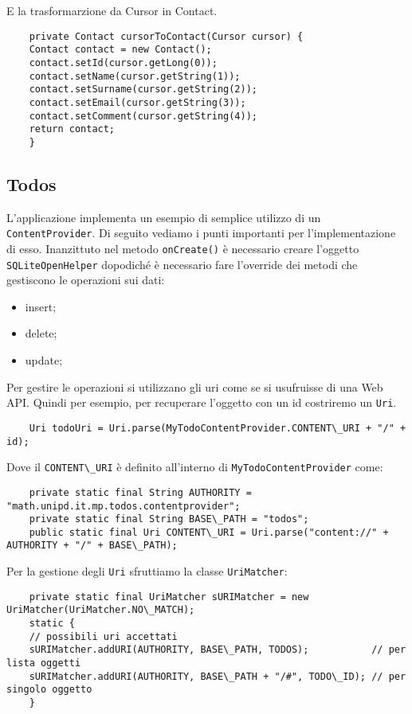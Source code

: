 	E la trasformarzione da Cursor in Contact.
	\begin{lstlisting}
	private Contact cursorToContact(Cursor cursor) {
	Contact contact = new Contact();
	contact.setId(cursor.getLong(0));
	contact.setName(cursor.getString(1));
	contact.setSurname(cursor.getString(2));
	contact.setEmail(cursor.getString(3));
	contact.setComment(cursor.getString(4));
	return contact;
	}
	\end{lstlisting}


	\subsection{Todos}
	L'applicazione implementa un esempio di semplice utilizzo di un \lstinline|ContentProvider|. Di seguito vediamo i punti importanti per l'implementazione di esso. Inanzittuto nel metodo \lstinline|onCreate()| è necessario creare l'oggetto \lstinline|SQLiteOpenHelper| dopodiché è necessario fare l'override dei metodi che gestiscono le operazioni sui dati:
	\begin{itemize}
		\item insert;
		\item delete;
		\item update;
	\end{itemize}

	Per gestire le operazioni si utilizzano gli uri come se si usufruisse di una Web API. Quindi per esempio, per recuperare l'oggetto con un id costriremo un \lstinline|Uri|.
	\begin{lstlisting}
	Uri todoUri = Uri.parse(MyTodoContentProvider.CONTENT\_URI + "/" + id);
	\end{lstlisting}

	Dove il \lstinline|CONTENT\_URI| è definito all'interno di \lstinline|MyTodoContentProvider| come:
	\begin{lstlisting}
	private static final String AUTHORITY = "math.unipd.it.mp.todos.contentprovider";
	private static final String BASE\_PATH = "todos";
	public static final Uri CONTENT\_URI = Uri.parse("content://" + AUTHORITY + "/" + BASE\_PATH);
	\end{lstlisting}

	Per la gestione degli \lstinline|Uri| sfruttiamo la classe \lstinline|UriMatcher|:
	\begin{lstlisting}
	private static final UriMatcher sURIMatcher = new UriMatcher(UriMatcher.NO\_MATCH);
	static {
	// possibili uri accettati
	sURIMatcher.addURI(AUTHORITY, BASE\_PATH, TODOS);			// per lista oggetti
	sURIMatcher.addURI(AUTHORITY, BASE\_PATH + "/#", TODO\_ID);	// per singolo oggetto
	}
	\end{lstlisting}

